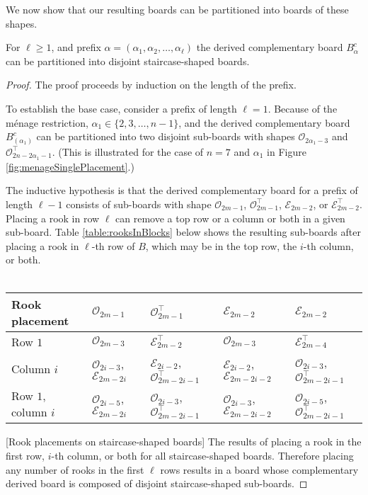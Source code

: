 We now show that our resulting boards can be partitioned into boards of these shapes.

\begin{lemma}
  For $\ell \geq 1$, and prefix $\alpha = (\alpha_1, \alpha_2, \dots, \alpha_\ell)$
  the derived complementary board $B_\alpha^c$ can be partitioned into
  disjoint staircase-shaped boards.
  \label{lemma:boardShape}
\end{lemma}
\begin{proof}
  The proof proceeds by induction on the length of the prefix.

  To establish the base case, consider a prefix of length $\ell = 1$.
  Because of the m\'enage restriction,
  $\alpha_1 \in \{2, 3, \dots, n-1\}$, and
  the derived complementary board $B_{(\alpha_1)}^c$
  can be partitioned into two disjoint sub-boards with shapes
  $\mathcal{O}_{2\alpha_1 - 3}$ and
  $\mathcal{O}^\intercal_{2n - 2\alpha_1 - 1}$.
  (This is illustrated for the case of $n = 7$ and $\alpha_1$ in
  Figure \ref{fig:menageSinglePlacement}.)

  The inductive hypothesis is that the derived complementary board for
  a prefix of length ${\ell - 1}$ consists of sub-boards with shape
  $\mathcal{O}_{2m - 1}$,
  $\mathcal{O}^\intercal_{2m - 1}$,
  $\mathcal{E}_{2m - 2}$, or
  $\mathcal{E}^\intercal_{2m - 2}$.
  Placing a rook in row $\ell$ can remove a top row or a column or both in a
  given sub-board.
  Table \ref{table:rooksInBlocks} below
  shows the resulting sub-boards after placing a rook in
  $\ell$-th row of $B$,
  which may be in the top row, the $i$-th column, or both.
  \\ ~ \\
  \captionsetup{type=table}
  \begin{tabular}{|l|l|l|l|l|}
  \hline
  Rook placement
    & $\mathcal{O}_{2m-1}$
    & $\mathcal{O}_{2m-1}^\intercal$
    & $\mathcal{E}_{2m-2}$
    & $\mathcal{E}_{2m-2}$
  \\ \hline
  Row $1$
    & $\mathcal{O}_{2m-3}$
    & $\mathcal{E}_{2m-2}^\intercal$
    & $\mathcal{O}_{2m-3}$
    & $\mathcal{E}_{2m-4}^\intercal$
  \\
  Column $i$
    & $\mathcal{O}_{2i-3}$, $\mathcal{E}_{2m-2i}$
    & $\mathcal{E}_{2i-2}$, $\mathcal{O}_{2m-2i-1}^\intercal$
    & $\mathcal{E}_{2i-2}$, $\mathcal{E}_{2m-2i-2}$
    & $\mathcal{O}_{2i-3}$, $\mathcal{O}_{2m-2i-1}^\intercal$
  \\
  Row $1$, column $i$
    & $\mathcal{O}_{2i-5}$, $\mathcal{E}_{2m-2i}$
    & $\mathcal{O}_{2i-3}$, $\mathcal{O}_{2m-2i-1}^\intercal$
    & $\mathcal{O}_{2i-3}$, $\mathcal{E}_{2m-2i-2}$
    & $\mathcal{O}_{2i-5}$, $\mathcal{O}_{2m-2i-1}^\intercal$
  \\ \hline
  \end{tabular}
  [Rook placements on staircase-shaped boards]{
    The results of placing a rook in the first row, $i$-th column, or both
    for all staircase-shaped boards.
  }
  \label{table:rooksInBlocks}
  Therefore placing any number of rooks in the first $\ell$ rows results in a
  board whose complementary derived board is composed of disjoint
  staircase-shaped sub-boards.
\end{proof}

